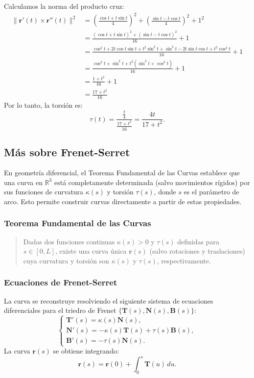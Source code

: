 \documentclass[11pt]{book}
\theoremstyle{definicion}
\theoremstyle{teorema}
\theoremstyle{ejemplo}
\begin{document}
Calculamos la norma del producto cruz:
\begin{align*}
\|\mathbf{r}'(t) \times \mathbf{r}''(t)\|^2 &= \left( \frac{\cos t + t \sin t}{4} \right)^2 + \left( \frac{\sin t - t \cos t}{4} \right)^2 + 1^2 \\
&= \frac{(\cos t + t \sin t)^2 + (\sin t - t \cos t)^2}{16} + 1 \\
&= \frac{\cos^2 t + 2 t \cos t \sin t + t^2 \sin^2 t + \sin^2 t - 2 t \sin t \cos t + t^2 \cos^2 t}{16} + 1 \\
&= \frac{\cos^2 t + \sin^2 t + t^2 (\sin^2 t + \cos^2 t)}{16} + 1 \\
&= \frac{1 + t^2}{16} + 1 \\
&= \frac{17 + t^2}{16}
\end{align*}
Por lo tanto, la torsión es:
\begin{equation*}
\tau(t) = \frac{\frac{t}{4}}{\frac{17 + t^2}{16}} = \frac{4t}{17 + t^2}.
\end{equation*}

\subsection{Más sobre Frenet-Serret}

\noindent En geometría diferencial, el {Teorema Fundamental de las Curvas} establece que una curva en \( \mathbb{R}^3 \) está completamente determinada (salvo movimientos rígidos) por sus funciones de {curvatura} \( \kappa(s) \) y {torsión} \( \tau(s) \), donde \( s \) es el parámetro de arco. Esto permite {construir} curvas directamente a partir de estas propiedades.

\subsubsection{Teorema Fundamental de las Curvas}
\begin{quote}
    Dadas dos funciones continuas \( \kappa(s) > 0 \) y \( \tau(s) \) definidas para \( s \in [0, L] \), existe una curva única \( \mathbf{r}(s) \) (salvo rotaciones y traslaciones) cuya curvatura y torsión son \( \kappa(s) \) y \( \tau(s) \), respectivamente.
\end{quote}

\subsubsection{Ecuaciones de Frenet-Serret}
\noindent La curva se reconstruye resolviendo el siguiente sistema de ecuaciones diferenciales para el {triedro de Frenet} \( \{\mathbf{T}(s), \mathbf{N}(s), \mathbf{B}(s)\} \):
\[
\begin{cases}
\mathbf{T}'(s) = \kappa(s) \mathbf{N}(s), \\
\mathbf{N}'(s) = -\kappa(s) \mathbf{T}(s) + \tau(s) \mathbf{B}(s), \\
\mathbf{B}'(s) = -\tau(s) \mathbf{N}(s).
\end{cases}
\]
La curva \( \mathbf{r}(s) \) se obtiene integrando:
\[
\mathbf{r}(s) = \mathbf{r}(0) + \int_0^s \mathbf{T}(u) \, du.
\]
\end{document}
